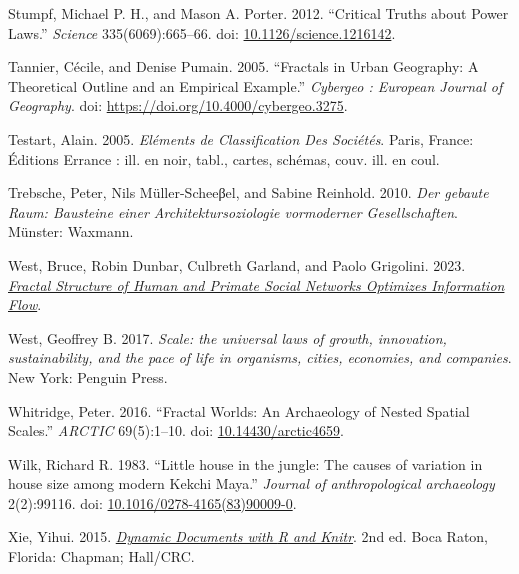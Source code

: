\documentclass[
  12pt,
]{book}
\newlength{\cslhangindent}
\newlength{\cslentryspacingunit} %
\newenvironment{CSLReferences}[2] %
 {%
  \setlength{\parindent}{0pt}
  \ifodd #1
  \let\oldpar\par
  \def\par{\hangindent=\cslhangindent\oldpar}
  \fi
  \setlength{\parskip}{#2\cslentryspacingunit}
 }%
 {}
\begin{document}
\begin{CSLReferences}{1}{0}
\leavevmode{}%
Stumpf, Michael P. H., and Mason A. Porter. 2012. {``Critical Truths about Power Laws.''} \emph{Science} 335(6069):665--66. doi: \href{https://doi.org/10.1126/science.1216142}{10.1126/science.1216142}.

\leavevmode{}%
Tannier, Cécile, and Denise Pumain. 2005. {``Fractals in Urban Geography: A Theoretical Outline and an Empirical Example.''} \emph{Cybergeo : European Journal of Geography}. doi: \url{https://doi.org/10.4000/cybergeo.3275}.

\leavevmode{}%
Testart, Alain. 2005. \emph{Eléments de Classification Des Sociétés}. Paris, France: Éditions Errance : ill. en noir, tabl., cartes, schémas, couv. ill. en coul.

\leavevmode{}%
Trebsche, Peter, Nils Müller-Scheeβel, and Sabine Reinhold. 2010. \emph{Der gebaute Raum: Bausteine einer Architektursoziologie vormoderner Gesellschaften}. Münster: Waxmann.

\leavevmode{}%
West, Bruce, Robin Dunbar, Culbreth Garland, and Paolo Grigolini. 2023. \emph{\href{https://doi.org/10.1101/2023.02.23.529431}{Fractal Structure of Human and Primate Social Networks Optimizes Information Flow}}.

\leavevmode{}%
West, Geoffrey B. 2017. \emph{Scale: the universal laws of growth, innovation, sustainability, and the pace of life in organisms, cities, economies, and companies}. New York: Penguin Press.

\leavevmode{}%
Whitridge, Peter. 2016. {``Fractal Worlds: An Archaeology of Nested Spatial Scales.''} \emph{ARCTIC} 69(5):1--10. doi: \href{https://doi.org/10.14430/arctic4659}{10.14430/arctic4659}.

\leavevmode{}%
Wilk, Richard R. 1983. {``Little house in the jungle: The causes of variation in house size among modern Kekchi Maya.''} \emph{Journal of anthropological archaeology} 2(2):99116. doi: \href{https://doi.org/10.1016/0278-4165(83)90009-0}{10.1016/0278-4165(83)90009-0}.

\leavevmode{}%
Xie, Yihui. 2015. \emph{\href{http://yihui.name/knitr/}{Dynamic Documents with {R} and Knitr}}. 2nd ed. Boca Raton, Florida: Chapman; Hall/CRC.


\end{CSLReferences}
\end{document}
